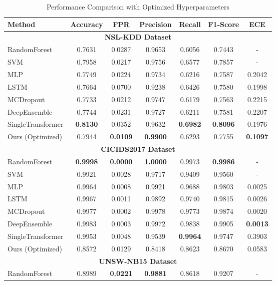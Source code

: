 \documentclass[journal]{IEEEtran}
\begin{document}
\begin{table}[htbp]
\centering
\caption{Performance Comparison with Optimized Hyperparameters}
\label{tab:main_results}
\begin{tabular}{l|ccccc|c}
\hline
\textbf{Method} & \textbf{Accuracy} & \textbf{FPR} & \textbf{Precision} & \textbf{Recall} & \textbf{F1-Score} & \textbf{ECE} \\
\hline
\multicolumn{7}{c}{\textbf{NSL-KDD Dataset}} \\
\hline
RandomForest & 0.7631 & 0.0287 & 0.9653 & 0.6056 & 0.7443 & - \\
SVM & 0.7958 & 0.0217 & 0.9756 & 0.6577 & 0.7857 & - \\
MLP & 0.7749 & 0.0224 & 0.9734 & 0.6216 & 0.7587 & 0.2042 \\
LSTM & 0.7664 & 0.0700 & 0.9238 & 0.6426 & 0.7580 & 0.1998 \\
MCDropout & 0.7733 & 0.0212 & 0.9747 & 0.6179 & 0.7563 & 0.2215 \\
DeepEnsemble & 0.7744 & 0.0231 & 0.9727 & 0.6211 & 0.7581 & 0.2207 \\
SingleTransformer & \textbf{0.8130} & 0.0352 & 0.9632 & \textbf{0.6982} & \textbf{0.8096} & 0.1976 \\
Ours (Optimized) & 0.7944 & \textbf{0.0109} & \textbf{0.9900} & 0.6293 & 0.7755 & \textbf{0.1097} \\
\hline
\multicolumn{7}{c}{\textbf{CICIDS2017 Dataset}} \\
\hline
RandomForest & \textbf{0.9998} & \textbf{0.0000} & \textbf{1.0000} & 0.9973 & \textbf{0.9986} & - \\
SVM & 0.9921 & 0.0028 & 0.9717 & 0.9409 & 0.9560 & - \\
MLP & 0.9964 & 0.0008 & 0.9921 & 0.9688 & 0.9803 & 0.0025 \\
LSTM & 0.9967 & 0.0011 & 0.9892 & 0.9740 & 0.9815 & 0.0026 \\
MCDropout & 0.9977 & 0.0002 & 0.9978 & 0.9773 & 0.9874 & 0.0020 \\
DeepEnsemble & 0.9983 & 0.0003 & 0.9972 & 0.9838 & 0.9905 & \textbf{0.0013} \\
SingleTransformer & 0.9953 & 0.0048 & 0.9539 & \textbf{0.9964} & 0.9747 & 0.3903 \\
Ours (Optimized) & 0.8572 & 0.0129 & 0.8418 & 0.8623 & 0.8670 & 0.0583 \\
\hline
\multicolumn{7}{c}{\textbf{UNSW-NB15 Dataset}} \\
\hline
RandomForest & 0.8989 & \textbf{0.0221} & \textbf{0.9881} & 0.8618 & 0.9207 & - \\

\end{tabular}
\end{table}
\end{document}
